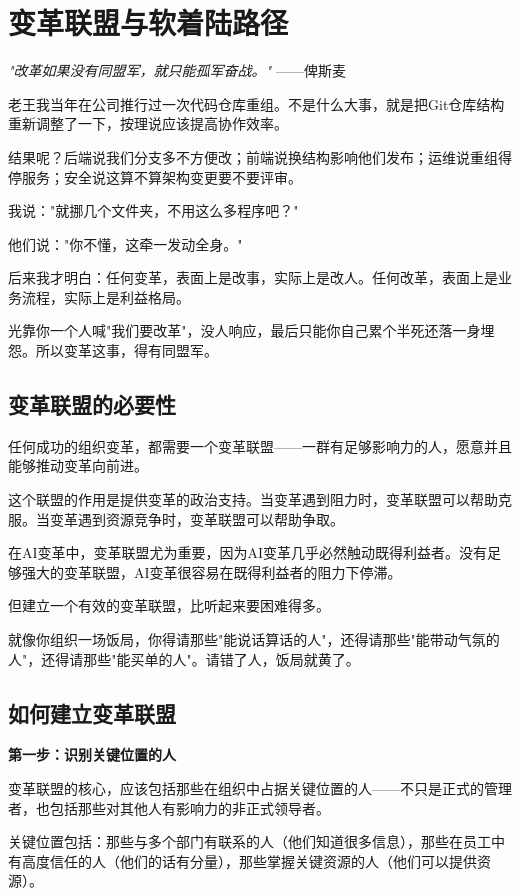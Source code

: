 \chapter{变革联盟与软着陆路径}


\textit{"改革如果没有同盟军，就只能孤军奋战。"}
——俾斯麦


老王我当年在公司推行过一次代码仓库重组。不是什么大事，就是把Git仓库结构重新调整了一下，按理说应该提高协作效率。

结果呢？后端说我们分支多不方便改；前端说换结构影响他们发布；运维说重组得停服务；安全说这算不算架构变更要不要评审。

我说："就挪几个文件夹，不用这么多程序吧？"

他们说："你不懂，这牵一发动全身。"

后来我才明白：任何变革，表面上是改事，实际上是改人。任何改革，表面上是业务流程，实际上是利益格局。

光靠你一个人喊"我们要改革"，没人响应，最后只能你自己累个半死还落一身埋怨。所以变革这事，得有同盟军。

\section{变革联盟的必要性}


任何成功的组织变革，都需要一个变革联盟——一群有足够影响力的人，愿意并且能够推动变革向前进。

这个联盟的作用是提供变革的政治支持。当变革遇到阻力时，变革联盟可以帮助克服。当变革遇到资源竞争时，变革联盟可以帮助争取。

在AI变革中，变革联盟尤为重要，因为AI变革几乎必然触动既得利益者。没有足够强大的变革联盟，AI变革很容易在既得利益者的阻力下停滞。

但建立一个有效的变革联盟，比听起来要困难得多。

就像你组织一场饭局，你得请那些"能说话算话的人"，还得请那些"能带动气氛的人"，还得请那些"能买单的人"。请错了人，饭局就黄了。

\section{如何建立变革联盟}


\textbf{第一步：识别关键位置的人}

变革联盟的核心，应该包括那些在组织中占据关键位置的人——不只是正式的管理者，也包括那些对其他人有影响力的非正式领导者。

关键位置包括：那些与多个部门有联系的人（他们知道很多信息），那些在员工中有高度信任的人（他们的话有分量），那些掌握关键资源的人（他们可以提供资源）。

